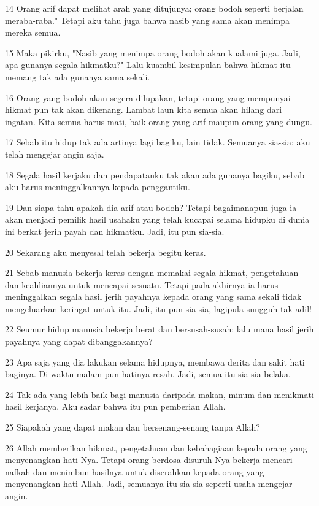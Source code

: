 \par 14 Orang arif dapat melihat arah yang ditujunya; orang bodoh seperti berjalan meraba-raba." Tetapi aku tahu juga bahwa nasib yang sama akan menimpa mereka semua.
\par 15 Maka pikirku, "Nasib yang menimpa orang bodoh akan kualami juga. Jadi, apa gunanya segala hikmatku?" Lalu kuambil kesimpulan bahwa hikmat itu memang tak ada gunanya sama sekali.
\par 16 Orang yang bodoh akan segera dilupakan, tetapi orang yang mempunyai hikmat pun tak akan dikenang. Lambat laun kita semua akan hilang dari ingatan. Kita semua harus mati, baik orang yang arif maupun orang yang dungu.
\par 17 Sebab itu hidup tak ada artinya lagi bagiku, lain tidak. Semuanya sia-sia; aku telah mengejar angin saja.
\par 18 Segala hasil kerjaku dan pendapatanku tak akan ada gunanya bagiku, sebab aku harus meninggalkannya kepada penggantiku.
\par 19 Dan siapa tahu apakah dia arif atau bodoh? Tetapi bagaimanapun juga ia akan menjadi pemilik hasil usahaku yang telah kucapai selama hidupku di dunia ini berkat jerih payah dan hikmatku. Jadi, itu pun sia-sia.
\par 20 Sekarang aku menyesal telah bekerja begitu keras.
\par 21 Sebab manusia bekerja keras dengan memakai segala hikmat, pengetahuan dan keahliannya untuk mencapai sesuatu. Tetapi pada akhirnya ia harus meninggalkan segala hasil jerih payahnya kepada orang yang sama sekali tidak mengeluarkan keringat untuk itu. Jadi, itu pun sia-sia, lagipula sungguh tak adil!
\par 22 Seumur hidup manusia bekerja berat dan bersusah-susah; lalu mana hasil jerih payahnya yang dapat dibanggakannya?
\par 23 Apa saja yang dia lakukan selama hidupnya, membawa derita dan sakit hati baginya. Di waktu malam pun hatinya resah. Jadi, semua itu sia-sia belaka.
\par 24 Tak ada yang lebih baik bagi manusia daripada makan, minum dan menikmati hasil kerjanya. Aku sadar bahwa itu pun pemberian Allah.
\par 25 Siapakah yang dapat makan dan bersenang-senang tanpa Allah?
\par 26 Allah memberikan hikmat, pengetahuan dan kebahagiaan kepada orang yang menyenangkan hati-Nya. Tetapi orang berdosa disuruh-Nya bekerja mencari nafkah dan menimbun hasilnya untuk diserahkan kepada orang yang menyenangkan hati Allah. Jadi, semuanya itu sia-sia seperti usaha mengejar angin.

